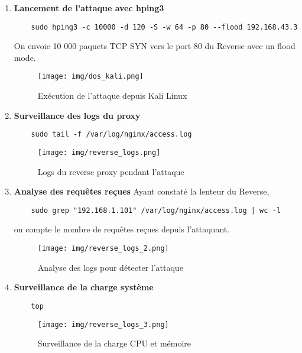 \documentclass[a4paper,12pt]{report}
\begin{document}
\begin{enumerate}
    \item \textbf{Lancement de l'attaque avec hping3}
    \begin{lstlisting}
    sudo hping3 -c 10000 -d 120 -S -w 64 -p 80 --flood 192.168.43.3
    \end{lstlisting}
    On envoie 10 000 paquets TCP SYN vers le port 80 du Reverse avec un flood mode.
    \begin{figure}[H]
    \begin{center}
        \texttt{[image: img/dos\_kali.png]}
        \caption{Exécution de l'attaque depuis Kali Linux}
    \end{center}
\end{figure}
    \item \textbf{Surveillance des logs du proxy}
    \begin{lstlisting}
    sudo tail -f /var/log/nginx/access.log
    \end{lstlisting}
    \begin{figure}[H]
    \begin{center}
        \texttt{[image: img/reverse\_logs.png]}
        \caption{Logs du reverse proxy pendant l'attaque}
    \end{center}
\end{figure}
    \item \textbf{Analyse des requêtes reçues}
    Ayant constaté la lenteur du Reverse, 
    \begin{lstlisting}
    sudo grep "192.168.1.101" /var/log/nginx/access.log | wc -l
    \end{lstlisting}
    on compte le nombre de requêtes reçues depuis l'attaquant.

    \begin{figure}[H]
    \begin{center}
        \texttt{[image: img/reverse\_logs\_2.png]}
        \caption{Analyse des logs pour détecter l'attaque}
    \end{center}
\end{figure}


    \item \textbf{Surveillance de la charge système}
    \begin{lstlisting}
    top
    \end{lstlisting}

    \begin{figure}[H]
    \begin{center}
        \texttt{[image: img/reverse\_logs\_3.png]}
        \caption{Surveillance de la charge CPU et mémoire}
    \end{center}
\end{figure}
    
\end{enumerate}
\end{document}
